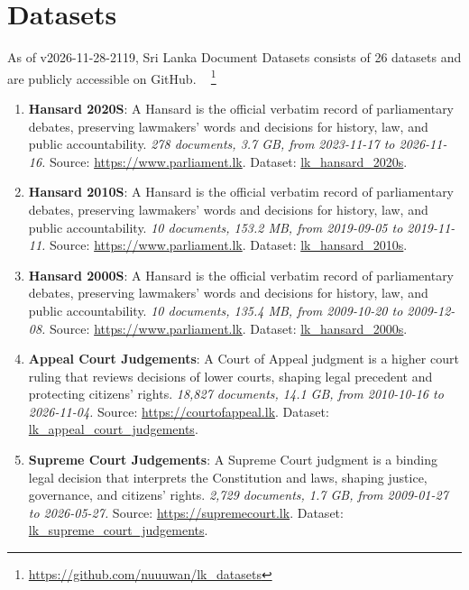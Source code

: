 \documentclass[10pt,a4paper]{article}%
\begin{document}
%
\section{Datasets}%
\label{sec:Datasets}%
As of v2026-11-28-2119, Sri Lanka Document Datasets
  consists of 26 datasets
 and are publicly accessible on GitHub.%
~%
\footnote{\href{https://github.com/nuuuwan/lk\_datasets}{https://github.com/nuuuwan/lk\_datasets}}%

%
\begin{enumerate}%
\item%
\textbf{Hansard 2020S}: A Hansard is the official verbatim record of parliamentary debates, preserving lawmakers’ words and decisions for history, law, and public accountability.\textit{ 278 documents, 3.7 GB, from 2023{-}11{-}17 to 2026{-}11{-}16.} Source: \href{https://www.parliament.lk}{https://www.parliament.lk}. Dataset: \href{https://github.com/nuuuwan/lk\_hansard/tree/data\_lk\_hansard\_2020s/data/lk\_hansard\_2020s}{lk\_hansard\_2020s}.%
\item%
\textbf{Hansard 2010S}: A Hansard is the official verbatim record of parliamentary debates, preserving lawmakers’ words and decisions for history, law, and public accountability.\textit{ 10 documents, 153.2 MB, from 2019{-}09{-}05 to 2019{-}11{-}11.} Source: \href{https://www.parliament.lk}{https://www.parliament.lk}. Dataset: \href{https://github.com/nuuuwan/lk\_hansard/tree/data\_lk\_hansard\_2010s/data/lk\_hansard\_2010s}{lk\_hansard\_2010s}.%
\item%
\textbf{Hansard 2000S}: A Hansard is the official verbatim record of parliamentary debates, preserving lawmakers’ words and decisions for history, law, and public accountability.\textit{ 10 documents, 135.4 MB, from 2009{-}10{-}20 to 2009{-}12{-}08.} Source: \href{https://www.parliament.lk}{https://www.parliament.lk}. Dataset: \href{https://github.com/nuuuwan/lk\_hansard/tree/data\_lk\_hansard\_2000s/data/lk\_hansard\_2000s}{lk\_hansard\_2000s}.%
\item%
\textbf{Appeal Court Judgements}: A Court of Appeal judgment is a higher court ruling that reviews decisions of lower courts, shaping legal precedent and protecting citizens’ rights.\textit{ 18,827 documents, 14.1 GB, from 2010{-}10{-}16 to 2026{-}11{-}04.} Source: \href{https://courtofappeal.lk}{https://courtofappeal.lk}. Dataset: \href{https://github.com/nuuuwan/lk\_appeal\_court\_judgements/tree/data/data/lk\_appeal\_court\_judgements}{lk\_appeal\_court\_judgements}.%
\item%
\textbf{Supreme Court Judgements}: A Supreme Court judgment is a binding legal decision that interprets the Constitution and laws, shaping justice, governance, and citizens’ rights.\textit{ 2,729 documents, 1.7 GB, from 2009{-}01{-}27 to 2026{-}05{-}27.} Source: \href{https://supremecourt.lk}{https://supremecourt.lk}. Dataset: \href{https://github.com/nuuuwan/lk\_supreme\_court\_judgements/tree/data/data/lk\_supreme\_court\_judgements}{lk\_supreme\_court\_judgements}.%

\end{enumerate}
\end{document}
